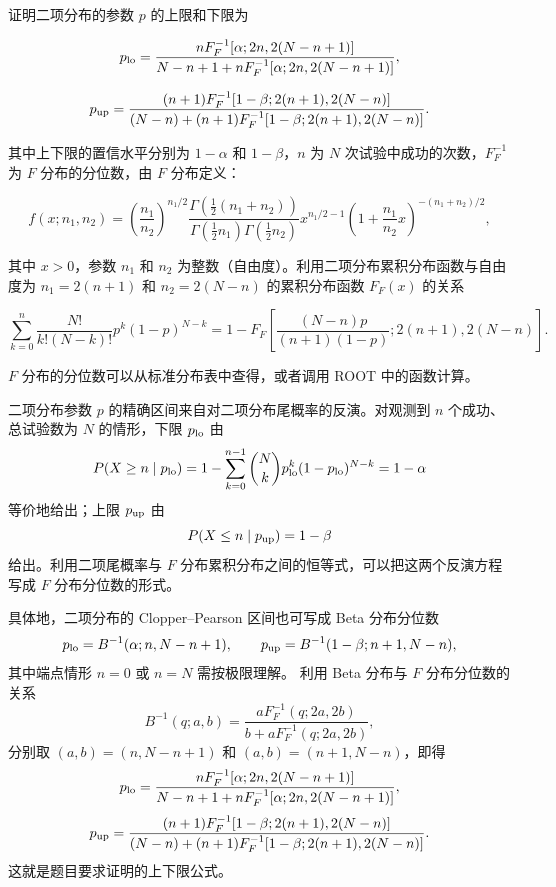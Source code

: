 \begin{question}
证明二项分布的参数 \(p\) 的上限和下限为

\[
p_{\rm lo}=\frac{nF_F^{-1}[\alpha;2n,2(N-n+1)]}{N-n+1+nF_F^{-1}[\alpha;2n,2(N-n+1)]},
\]

\[
p_{\rm up}=\frac{(n+1)F_F^{-1}[1-\beta;2(n+1),2(N-n)]}{(N-n)+(n+1)F_F^{-1}[1-\beta;2(n+1),2(N-n)]}.
\]

其中上下限的置信水平分别为 \(1-\alpha\) 和 \(1-\beta\)，\(n\) 为 \(N\)
次试验中成功的次数，\(F_F^{-1}\) 为 \(F\) 分布的分位数，由 \(F\)
分布定义：

\[
f(x;n_1,n_2)=\left(\frac{n_1}{n_2}\right)^{n_1/2}
\frac{\Gamma\left(\frac12(n_1+n_2)\right)}{\Gamma\left(\frac12n_1\right)\Gamma\left(\frac12n_2\right)}
x^{n_1/2-1}\left(1+\frac{n_1}{n_2}x\right)^{-(n_1+n_2)/2},
\]

其中 \(x>0\)，参数 \(n_1\) 和 \(n_2\)
为整数（自由度）。利用二项分布累积分布函数与自由度为 \(n_1=2(n+1)\) 和
\(n_2=2(N-n)\) 的累积分布函数 \(F_F(x)\) 的关系

\[
\sum_{k=0}^{n}\frac{N!}{k!(N-k)!}p^k(1-p)^{N-k}
=1-F_F\left[\frac{(N-n)p}{(n+1)(1-p)};2(n+1),2(N-n)\right].
\]

\(F\) 分布的分位数可以从标准分布表中查得，或者调用 ROOT 中的函数计算。
\begin{solution}
二项分布参数 \(p\) 的精确区间来自对二项分布尾概率的反演。对观测到
\(n\) 个成功、总试验数为 \(N\) 的情形，下限 \(p_{\rm lo}\) 由
\[
P(X\ge n\mid p_{\rm lo})=1-\sum_{k=0}^{n-1}\binom Nk p_{\rm lo}^k(1-p_{\rm lo})^{N-k}=1-\alpha
\]
等价地给出；上限 \(p_{\rm up}\) 由
\[
P(X\le n\mid p_{\rm up})=1-\beta
\]
给出。利用二项尾概率与 \(F\) 分布累积分布之间的恒等式，可以把这两个反演方程写成
\(F\) 分布分位数的形式。

具体地，二项分布的 Clopper--Pearson 区间也可写成 Beta 分布分位数
\[
p_{\rm lo}=B^{-1}(\alpha;n,N-n+1),
\qquad
p_{\rm up}=B^{-1}(1-\beta;n+1,N-n),
\]
其中端点情形 \(n=0\) 或 \(n=N\) 需按极限理解。
利用 Beta 分布与 \(F\) 分布分位数的关系
\[
B^{-1}(q;a,b)=
\frac{aF_F^{-1}(q;2a,2b)}{b+aF_F^{-1}(q;2a,2b)},
\]
分别取 \((a,b)=(n,N-n+1)\) 和 \((a,b)=(n+1,N-n)\)，即得
\[
p_{\rm lo}=
\frac{nF_F^{-1}[\alpha;2n,2(N-n+1)]}
{N-n+1+nF_F^{-1}[\alpha;2n,2(N-n+1)]},
\]
\[
p_{\rm up}=
\frac{(n+1)F_F^{-1}[1-\beta;2(n+1),2(N-n)]}
{(N-n)+(n+1)F_F^{-1}[1-\beta;2(n+1),2(N-n)]}.
\]
这就是题目要求证明的上下限公式。
\end{solution}
\end{question}


